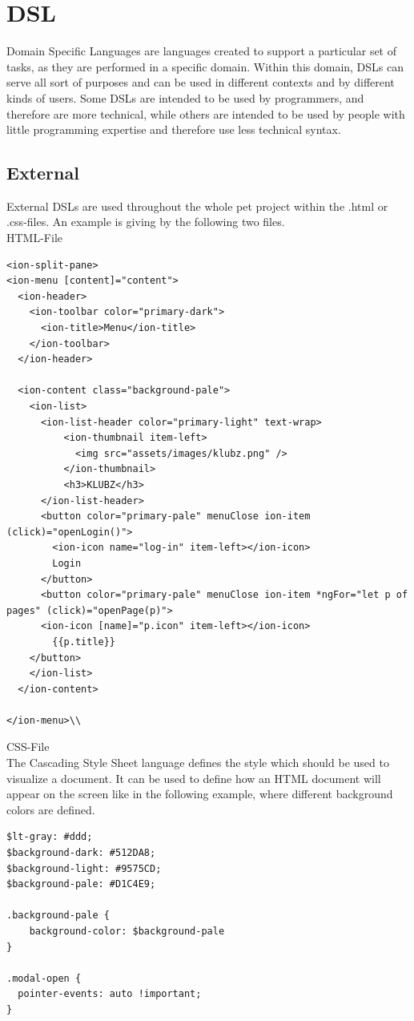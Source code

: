 \documentclass[12pt]{article}
\begin{document}
\section{DSL}
Domain Specific Languages are languages created to support a particular set of tasks, as they are performed in a specific domain.
Within this domain, DSLs can serve all sort of purposes and can be used in different contexts and by different kinds of users. Some DSLs are intended to be used by programmers, and therefore are more technical, while others are intended to be used by people with little programming expertise and therefore use less technical syntax.
\subsection{External}
External DSLs are used throughout the whole pet project within the .html or .css-files. An example is giving by the following two files.\\

HTML-File\\
\begin{lstlisting}
<ion-split-pane>
<ion-menu [content]="content">
  <ion-header>
    <ion-toolbar color="primary-dark">
      <ion-title>Menu</ion-title>
    </ion-toolbar>
  </ion-header>

  <ion-content class="background-pale">
    <ion-list>
      <ion-list-header color="primary-light" text-wrap>
          <ion-thumbnail item-left>
            <img src="assets/images/klubz.png" />
          </ion-thumbnail>
          <h3>KLUBZ</h3>
      </ion-list-header>
      <button color="primary-pale" menuClose ion-item (click)="openLogin()">
        <ion-icon name="log-in" item-left></ion-icon>
        Login
      </button>
      <button color="primary-pale" menuClose ion-item *ngFor="let p of pages" (click)="openPage(p)">
      <ion-icon [name]="p.icon" item-left></ion-icon>
        {{p.title}}
    </button>
    </ion-list>
  </ion-content>

</ion-menu>\\
\end{lstlisting}

CSS-File\\
The Cascading Style Sheet language defines the style which should be used to visualize a document. It can be used to define how an HTML document will appear on the screen like in the following example, where different background colors are defined.
\begin{lstlisting}
$lt-gray: #ddd;
$background-dark: #512DA8;
$background-light: #9575CD;
$background-pale: #D1C4E9;

.background-pale {
    background-color: $background-pale
}

.modal-open {
  pointer-events: auto !important;
}
\end{lstlisting}
\end{document}
